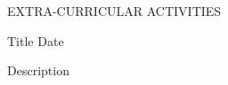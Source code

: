 
\begin{ResumeSection}{EXTRA-CURRICULAR ACTIVITIES} 

    \begin{DatedField}
        {Title}
        {Date}
        {}
        {}
        \item Description
    \end{DatedField}
    
\end{ResumeSection}